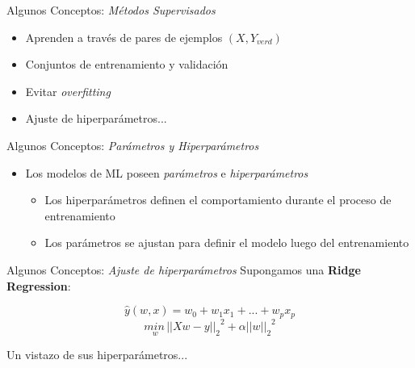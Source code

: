 \documentclass[10pt]{beamer}
\begin{document}
\begin{frame}{Algunos Conceptos: \textit{Métodos Supervisados}}
\begin{itemize}[<+->]
  \item Aprenden a través de pares de ejemplos $(X, Y_{verd})$
  \item Conjuntos de entrenamiento y validación
  \item Evitar \textit{overfitting}
  \item Ajuste de hiperparámetros...
\end{itemize}
\end{frame}

\begin{frame}{Algunos Conceptos: \textit{Parámetros y Hiperparámetros}}
  \begin{itemize}
    \item Los modelos de ML poseen \textit{parámetros} e \textit{hiperparámetros}
    \begin{itemize}[<+->]
      \item Los hiperparámetros definen el comportamiento durante el proceso de entrenamiento
      \item Los parámetros se ajustan para definir el modelo luego del entrenamiento
    \end{itemize}

  \end{itemize}
\end{frame}


\begin{frame}{Algunos Conceptos: \textit{Ajuste de hiperparámetros}}
  Supongamos una \textbf{Ridge Regression}:
  \begin{center}
    $$\hat{y}(w, x) = w_0 + w_1 x_1 + ... + w_p x_p$$
    $$\underset{w}{min\,}{{||X w - y||_2}}^2 + \alpha{||w||_2}^2$$
  \end{center}
  \pause
  Un vistazo de sus hiperparámetros...
  \ridge
\end{frame}



\end{document}
